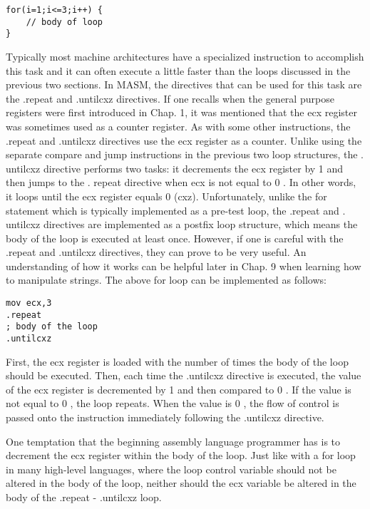 \documentclass[10pt]{article}
\begin{document}
\begin{verbatim}
for(i=1;i<=3;i++) {
    // body of loop
}
\end{verbatim}

Typically most machine architectures have a specialized instruction to accomplish this task and it can often execute a little faster than the loops discussed in the previous two sections. In MASM, the directives that can be used for this task are the .repeat and .untilcxz directives. If one recalls when the general purpose registers were first introduced in Chap. 1, it was mentioned that the ecx register was sometimes used as a counter register. As with some other instructions, the .repeat and .untilcxz directives use the ecx register as a counter. Unlike using the separate compare and jump instructions in the previous two loop structures, the . untilcxz directive performs two tasks: it decrements the ecx register by 1 and then jumps to the . repeat directive when ecx is not equal to 0 . In other words, it loops until the ecx register equals 0 (cxz). Unfortunately, unlike the for statement which is typically implemented as a pre-test loop, the .repeat and . untilcxz directives are implemented as a postfix loop structure, which means the body of the loop is executed at least once. However, if one is careful with the .repeat and .untilcxz directives, they can prove to be very useful. An understanding of how it works can be helpful later in Chap. 9 when learning how to manipulate strings. The above for loop can be implemented as follows:

\begin{verbatim}
mov ecx,3
.repeat
; body of the loop
.untilcxz
\end{verbatim}

First, the ecx register is loaded with the number of times the body of the loop should be executed. Then, each time the .untilcxz directive is executed, the value of the ecx register is decremented by 1 and then compared to 0 . If the value is not equal to 0 , the loop repeats. When the value is 0 , the flow of control is passed onto the instruction immediately following the .untilcxz directive.

One temptation that the beginning assembly language programmer has is to decrement the ecx register within the body of the loop. Just like with a for loop in many high-level languages, where the loop control variable should not be altered in the body of the loop, neither should the ecx variable be altered in the body of the .repeat - .untilcxz loop.
\end{document}
